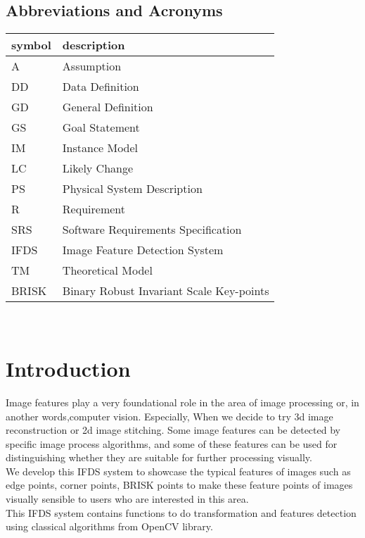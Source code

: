 \documentclass[12pt]{article}
\begin{document}
\subsection{Abbreviations and Acronyms}

\renewcommand{\arraystretch}{1.2}
\begin{tabular}{l l} 
  \toprule		
  \textbf{symbol} & \textbf{description}\\
  \midrule 
  A & Assumption\\
  DD & Data Definition\\
  GD & General Definition\\
  GS & Goal Statement\\
  IM & Instance Model\\
  LC & Likely Change\\
  PS & Physical System Description\\
  R & Requirement\\
  SRS & Software Requirements Specification\\
  IFDS & Image Feature Detection System\\
  TM & Theoretical Model\\
  BRISK & Binary Robust Invariant Scale Key-points\\
  \bottomrule
\end{tabular}\\



\newpage








\section{Introduction}

Image features play a very foundational role in the area of image processing or, in another words,computer vision. Especially, When we decide to try 3d image reconstruction or 2d image stitching.
Some image features can be detected by specific image process algorithms, and  some of these features can be used for distinguishing whether they are suitable for further processing visually.\\
We develop this IFDS system to showcase the typical features of images such as edge points, corner points, BRISK points to make these feature points of images visually sensible to users who are interested in this area. \\
This IFDS system contains functions to do transformation and features detection using classical algorithms from OpenCV library. \\
\end{document}
